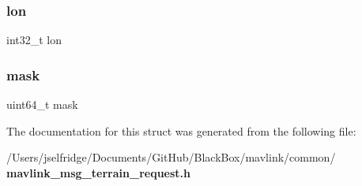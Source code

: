 \mbox{\label{struct____mavlink__terrain__request__t_a14be207fbed30fba5d322cb03bc5f228}} 
\subsubsection{lon}
{\footnotesize\ttfamily int32\+\_\+t lon}

\mbox{\label{struct____mavlink__terrain__request__t_a6f26bbb3e63b096143b8024debecedf9}} 
\subsubsection{mask}
{\footnotesize\ttfamily uint64\+\_\+t mask}



The documentation for this struct was generated from the following file\+:\begin{DoxyCompactItemize}
\item 
/\+Users/jselfridge/\+Documents/\+Git\+Hub/\+Black\+Box/mavlink/common/\textbf{ mavlink\+\_\+msg\+\_\+terrain\+\_\+request.\+h}\end{DoxyCompactItemize}
